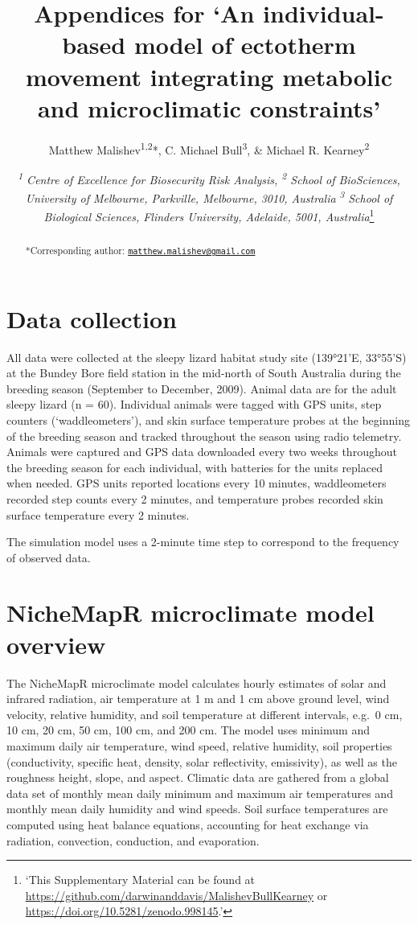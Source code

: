 \documentclass[]{article}
\title{Appendices for `An individual-based model of ectotherm movement
integrating metabolic and microclimatic constraints'}
\subtitle{Matthew Malishev\textsuperscript{1,2}*, C. Michael
Bull\textsuperscript{3}, \& Michael R. Kearney\textsuperscript{2}}
\author{\emph{\textsuperscript{1} Centre of Excellence for Biosecurity Risk
Analysis, \textsuperscript{2} School of BioSciences, University of
Melbourne, Parkville, Melbourne, 3010, Australia}
\emph{\textsuperscript{3} School of Biological Sciences, Flinders
University, Adelaide, 5001, Australia}\footnote{`This Supplementary
  Material can be found at
  \url{https://github.com/darwinanddavis/MalishevBullKearney} or
  \url{https://doi.org/10.5281/zenodo.998145}.'}}
\date{}
\let\oldsubparagraph\subparagraph
\renewcommand{\subparagraph}[1]{\oldsubparagraph{#1}\mbox{}}
\begin{document}
\maketitle
\begin{abstract}
*Corresponding author:
\href{mailto:matthew.malishev@gmail.com}{\nolinkurl{matthew.malishev@gmail.com}}
\end{abstract}

{
\setcounter{tocdepth}{2}
\tableofcontents
}
\subparagraph{}\label{section}

\section{Data collection}\label{data-collection}

All data were collected at the sleepy lizard habitat study site
(139°21'E, 33°55'S) at the Bundey Bore field station in the mid-north of
South Australia during the breeding season (September to December,
2009). Animal data are for the adult sleepy lizard (n = 60). Individual
animals were tagged with GPS units, step counters (`waddleometers'), and
skin surface temperature probes at the beginning of the breeding season
and tracked throughout the season using radio telemetry. Animals were
captured and GPS data downloaded every two weeks throughout the breeding
season for each individual, with batteries for the units replaced when
needed. GPS units reported locations every 10 minutes, waddleometers
recorded step counts every 2 minutes, and temperature probes recorded
skin surface temperature every 2 minutes.

The simulation model uses a 2-minute time step to correspond to the
frequency of observed data.

\subparagraph{}\label{section-1}

\section{NicheMapR microclimate model
overview}\label{nichemapr-microclimate-model-overview}

The NicheMapR microclimate model calculates hourly estimates of solar
and infrared radiation, air temperature at 1 m and 1 cm above ground
level, wind velocity, relative humidity, and soil temperature at
different intervals, e.g.~0 cm, 10 cm, 20 cm, 50 cm, 100 cm, and 200 cm.
The model uses minimum and maximum daily air temperature, wind speed,
relative humidity, soil properties (conductivity, specific heat,
density, solar reflectivity, emissivity), as well as the roughness
height, slope, and aspect. Climatic data are gathered from a global data
set of monthly mean daily minimum and maximum air temperatures and
monthly mean daily humidity and wind speeds. Soil surface temperatures
are computed using heat balance equations, accounting for heat exchange
via radiation, convection, conduction, and evaporation.
\end{document}
